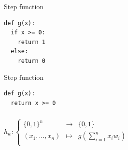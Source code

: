 \begin{frame}[fragile]
  \begin{block}{Step function}
      \begin{lstlisting}
def g(x):
  if x >= 0:
    return 1
  else:
    return 0
      \end{lstlisting}
  \end{block}
\end{frame}

\begin{frame}[fragile]
  \begin{block}{Step function}
      \begin{lstlisting}
def g(x):
  return x >= 0
      \end{lstlisting}
  \end{block}
\end{frame}


\begin{frame}
  \frametitle{}
  $h_w:
  \left \{
    \begin{array}{ccc}
      \{0, 1\}^n & \to & \{0, 1\} \\
      (x_1, \ldots, x_{n}) & \mapsto &
      g \left( \displaystyle\sum_{i=1}^{n}{x_i w_i} \right) \\
    \end{array}
  \right.$
\end{frame}

